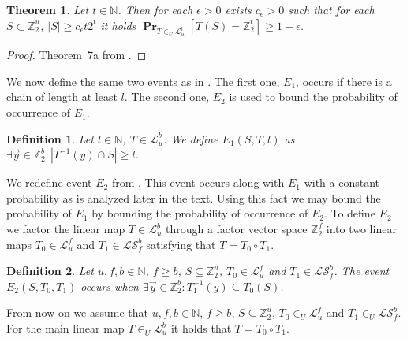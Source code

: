 \documentclass{article}
\newcommand{\vecspace}[2]{\mathbb{Z}_{#1}^{#2}}
\newcommand{\binvecspace}[1]{\vecspace{2}{#1}}
\newcommand{\linearmaps}[2]{\mathcal{L}_{#1}^{#2}}
\newcommand{\surjectivelinearmaps}[2]{\mathcal{LS}_{#1}^{#2}}
\newcommand{\probs}[2]{\operatorname{\mathbf{Pr}}_{{#1}}\left[{#2}\right]}
\newtheorem{definition}{Definition}
\newtheorem{theorem}{Theorem}
\begin{document}
\begin{theorem}
\label{theorem-epsilon}
Let $t \in \mathbb{N}$.
Then for each $\epsilon > 0$ exists $c_\epsilon > 0$ such that for each $S \subset \binvecspace{u}$, $|S| \geq c_\epsilon t 2^t$ it holds  $\probs{T \in_U \linearmaps{u}{t}}{T(S) = \binvecspace{t}} \geq 1 - \epsilon$.
\end{theorem}
\begin{proof}
Theorem~{7a} from \cite{alonetal}.
\end{proof}

We now define the same two events as in \cite{alonetal}.
The first one, $E_1$, occurs if there is a chain of length at least $l$.
The second one, $E_2$ is used to bound the probability of occurrence of  $E_1$.
\begin{definition}
Let $l \in \mathbb{N}$, $T \in \linearmaps{u}{b}$. We define $E_1(S, T, l)$ as $\exists \vec{y} \in \binvecspace{b} \colon |T^{-1}(y) \cap S| \geq l$.
\end{definition}

We redefine event $E_2$ from \cite{alonetal}. 
This event occurs along with $E_1$ with a constant probability as is analyzed later in the text. 
Using this fact we may bound the probability of $E_1$ by bounding the probability of occurrence of $E_2$. 
To define $E_2$ we factor the linear map $T \in \linearmaps{u}{b}$ through a factor vector space $\binvecspace{f}$ into two linear maps $T_0 \in \linearmaps{u}{f}$ and $T_1 \in \surjectivelinearmaps{f}{b}$ satisfying that $T = T_0 \circ T_1$.
\begin{definition}
Let $u, f, b \in \mathbb{N}$, $f \geq b$, $S \subseteq \binvecspace{u}$, $T_0 \in \linearmaps{u}{f}$ and $T_1 \in \surjectivelinearmaps{f}{b}$.
The event $E_2(S, T_0, T_1)$ occurs when $\exists \vec{y} \in \binvecspace{b} \colon T_1^{-1}(y) \subseteq T_0(S)$.
\end{definition}

From now on we assume that $u, f, b \in \mathbb{N}$, $f \geq b$, $S \subseteq \binvecspace{u}$, $T_0 \in_U \linearmaps{u}{f}$ and $T_1 \in_U \surjectivelinearmaps{f}{b}$. 
For the main linear map $T \in_U \linearmaps{u}{b}$ it holds that $T = T_0 \circ T_1$.
\end{document}
